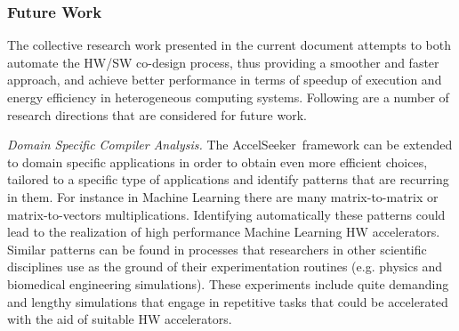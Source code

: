 \documentclass[]{usiinfthesis}
\newcommand{\aseeker}{{AccelSeeker}}
\newcommand{\rseeker}{{RegionSeeker}}
\begin{document}



\subsubsection{Future Work}


The collective research work presented in the current document attempts to both automate the HW/SW 
co-design process, thus providing a smoother and faster approach, and achieve better performance in 
terms of speedup of execution and energy efficiency in heterogeneous computing systems. Following 
are a number of research directions that are considered for future work.\par

\emph{Domain Specific Compiler Analysis.} The \aseeker\ framework can be extended to domain specific applications 
in order to obtain even more efficient choices, tailored to a specific type of applications and identify patterns 
that are recurring in them.
For instance in Machine Learning there are many matrix-to-matrix or matrix-to-vectors multiplications.
Identifying automatically these patterns could lead to the realization of high performance Machine Learning
HW accelerators. Similar patterns can be found in processes that researchers in other scientific disciplines
use as the ground of their experimentation routines (e.g. physics and biomedical engineering simulations). These experiments include quite demanding and lengthy 
simulations that engage in repetitive tasks that could be accelerated with the aid of suitable HW 
accelerators.\par
\end{document}

